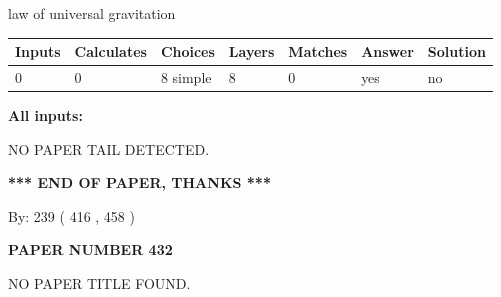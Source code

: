 \documentclass[12pt]{article}
\begin{document}
 
law of universal gravitation
 
 
\noindent{}
 
 
   
   
   
   
\noindent\begin{tabular}{|l|l|l|l|l|l|l|}
 \hline
Inputs & Calculates & Choices & Layers & Matches & Answer & Solution \\ \hline
 0  & 
 0  & 
 8
  simple  
  & 
 8  & 
 0  & 
  yes & 
  no 
  \\ \hline
 \end{tabular}
   
   
   
   
\noindent{}
   
   
   
   
\noindent\vspace{0.1in}\hspace{-0.08in} {\textbf{\Large{All inputs: }}}
   
   
   
   
\vspace{2.0in} NO PAPER TAIL DETECTED.
   
   
   
   
\vspace{1.0in} 
{\textbf{\large{ *** END OF PAPER, THANKS *** }}} 
   
   
\hspace{1.0in} By: 
 239 ( 416 ,  458 )
   
   
   
   
\newpage 
\setcounter{page}{ 
   432001 } 
   
   
   
   
 {\textbf{ \Large{ PAPER NUMBER  432  }}}
   
   
\vspace{0.2in}
   
   
   
   
   
   
 NO PAPER TITLE FOUND.
   
   
   
\vspace{0.2in}
   
\end{document}
